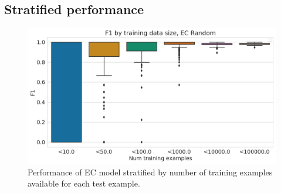 \clearpage
\DIFaddend \subsection{Stratified performance}
\begin{figure}[htbp]
\centering
  \DIFdelbeginFL %
\DIFdelendFL \DIFaddbeginFL \includegraphics[width=\textwidth]{ec_f1_by_training_size.png}
  \DIFaddendFL \caption{Performance of EC model stratified by number of training examples available for each test example.}
  \label{sup:fig:ec_f1_by_training_size}
\end{figure}


\DIFdelbegin %


